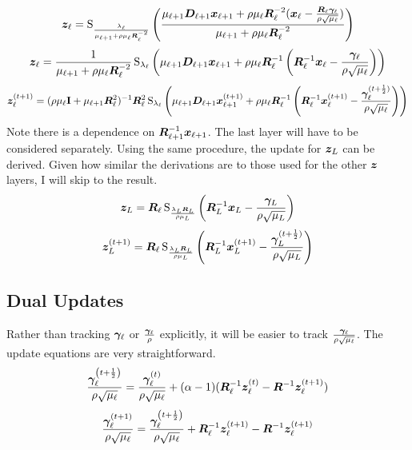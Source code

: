 %
\begin{equation}
\bm{z}_{\ell} = \operatorname{S}_{\frac{\lambda_{\ell}}{\mu_{\ell + 1} + \rho\mu_{\ell}\bm{R}_{\ell}^{-2}}}\left(\frac{\mu_{\ell + 1}\bm{D}_{\ell + 1}\bm{x}_{\ell + 1} + \rho\mu_{\ell}\bm{R}_{\ell}^{-2}(\bm{x}_{\ell} - \frac{\bm{R}_{\ell}\bm{\gamma}_{\ell}}{\rho\sqrt{\mu_{\ell}}})}{\mu_{\ell + 1} + \rho\mu_{\ell}\bm{R}_{\ell}^{-2}}\right)
\end{equation}
%
\begin{equation}
\bm{z}_{\ell} = \frac{1}{\mu_{\ell + 1} + \rho\mu_{\ell}\bm{R}_{\ell}^{-2}}\operatorname{S}_{\lambda_{\ell}}\left(\mu_{\ell + 1}\bm{D}_{\ell + 1}\bm{x}_{\ell + 1} + \rho\mu_{\ell}\bm{R}_{\ell}^{-1}\left(\bm{R}_{\ell}^{-1}\bm{x}_{\ell} - \frac{\bm{\gamma}_{\ell}}{\rho\sqrt{\mu_{\ell}}}\right)\right)
\end{equation}
%
\begin{equation}
\bm{z}_{\ell}^{(t + 1)} = (\rho\mu_{\ell}{\bf I} + \mu_{\ell + 1}\bm{R}_{\ell}^2)^{-1}\bm{R}_{\ell}^2\operatorname{S}_{\lambda_{\ell}}\left(\mu_{\ell + 1}\bm{D}_{\ell + 1}\bm{x}_{\ell + 1}^{(t + 1)} + \rho\mu_{\ell}\bm{R}_{\ell}^{-1}\left(\bm{R}_{\ell}^{-1}\bm{x}_{\ell}^{(t + 1)} - \frac{\bm{\gamma}_{\ell}^{(t + \frac{1}{2})}}{\rho\sqrt{\mu_{\ell}}}\right)\right)
\end{equation}
%
Note there is a dependence on $\bm{R}_{\ell + 1}^{-1}\bm{x}_{\ell + 1}$. The last layer will have to be considered separately. Using the same procedure, the update for $\bm{z}_L$ can be derived. Given how similar the derivations are to those used for the other $\bm{z}$ layers, I will skip to the result.
%
%
\begin{equation}
\bm{z}_L = \bm{R}_{\ell}\operatorname{S}_{\frac{\lambda_L\bm{R}_L}{\rho\mu_L}}\left(\bm{R}_L^{-1}\bm{x}_L - \frac{\bm{\gamma}_L}{\rho\sqrt{\mu_L}}\right)
\end{equation}
%
\begin{equation}
\bm{z}_L^{(t + 1)} = \bm{R}_{\ell}\operatorname{S}_{\frac{\lambda_L\bm{R}_L}{\rho\mu_L}}\left(\bm{R}_L^{-1}\bm{x}_L^{(t + 1)} - \frac{\bm{\gamma}_L^{(t + \frac{1}{2})}}{\rho\sqrt{\mu_L}}\right)
\end{equation}

\subsection{Dual Updates}
Rather than tracking $\bm{\gamma}_{\ell}$ or $\frac{\bm{\gamma}_{\ell}}{\rho}$ explicitly, it will be easier to track $\frac{\bm{\gamma}_{\ell}}{\rho\sqrt{\mu_{\ell}}}$. The update equations are very straightforward.
%
\begin{equation}
\frac{\bm{\gamma}_{\ell}^{\left(t + \frac{1}{2}\right)}}{\rho\sqrt{\mu_{\ell}}} = \frac{\bm{\gamma}_{\ell}^{(t)}}{\rho\sqrt{\mu_{\ell}}} + (\alpha - 1)(\bm{R}_{\ell}^{-1}\bm{z}_{\ell}^{(t)} - \bm{R}^{-1}\bm{z}_{\ell}^{(t + 1)})
\end{equation}
%
\begin{equation}
\frac{\bm{\gamma}_{\ell}^{(t + 1)}}{\rho\sqrt{\mu_{\ell}}} = \frac{\bm{\gamma}_{\ell}^{\left(t + \frac{1}{2}\right)}}{\rho\sqrt{\mu_{\ell}}} + \bm{R}_{\ell}^{-1}\bm{z}_{\ell}^{(t + 1)} - \bm{R}^{-1}\bm{z}_{\ell}^{(t + 1)} 
\end{equation}

